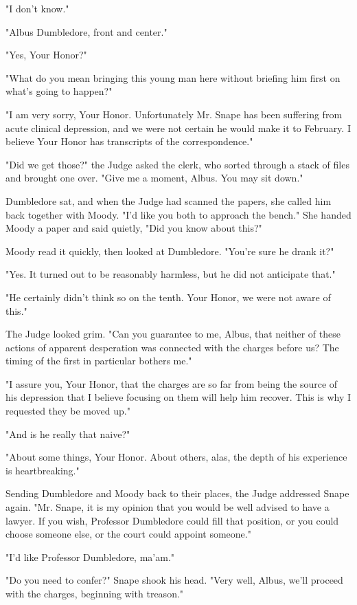 "I don't know."

"Albus Dumbledore, front and center."

"Yes, Your Honor?"

"What do you mean bringing this young man here without briefing him first on what's going to happen?"

"I am very sorry, Your Honor. Unfortunately Mr. Snape has been suffering from acute clinical depression, and we were not certain he would make it to February. I believe Your Honor has transcripts of the correspondence."

"Did we get those?" the Judge asked the clerk, who sorted through a stack of files and brought one over. "Give me a moment, Albus. You may sit down."

Dumbledore sat, and when the Judge had scanned the papers, she called him back together with Moody. "I'd like you both to approach the bench." She handed Moody a paper and said quietly, "Did you know about this?"

Moody read it quickly, then looked at Dumbledore. "You're sure he drank it?"

"Yes. It turned out to be reasonably harmless, but he did not anticipate that."

"He certainly didn't think so on the tenth. Your Honor, we were not aware of this."

The Judge looked grim. "Can you guarantee to me, Albus, that neither of these actions of apparent desperation was connected with the charges before us? The timing of the first in particular bothers me."

"I assure you, Your Honor, that the charges are so far from being the source of his depression that I believe focusing on them will help him recover. This is why I requested they be moved up."

"And is he really that naive?"

"About some things, Your Honor. About others, alas, the depth of his experience is heartbreaking."

Sending Dumbledore and Moody back to their places, the Judge addressed Snape again. "Mr. Snape, it is my opinion that you would be well advised to have a lawyer. If you wish, Professor Dumbledore could fill that position, or you could choose someone else, or the court could appoint someone."

"I'd like Professor Dumbledore, ma'am."

"Do you need to confer?" Snape shook his head. "Very well, Albus, we'll proceed with the charges, beginning with treason."

